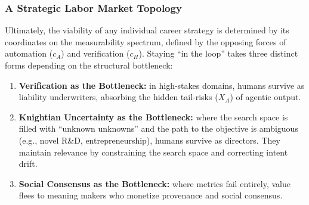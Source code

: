 \documentclass[12pt, letter]{article}
\begin{document}
\subsubsection{A Strategic Labor Market Topology}

Ultimately, the viability of any individual career strategy is determined by its coordinates on the measurability spectrum, defined by the opposing forces of automation ($c_A$) and verification ($c_H$). Staying ``in the loop'' takes three distinct forms depending on the structural bottleneck:

\begin{enumerate}

\item \textbf{Verification as the Bottleneck:} in high-stakes domains, humans survive as liability underwriters, absorbing the hidden tail-risks ($X_A$) of agentic output.

\item \textbf{Knightian Uncertainty as the Bottleneck:} where the search space is filled with ``unknown unknowns'' and the path to the objective is ambiguous (e.g., novel R\&D, entrepreneurship), humans survive as directors. They maintain relevance by constraining the search space and correcting intent drift.

\item \textbf{Social Consensus as the Bottleneck:} where metrics fail entirely, value flees to meaning makers who monetize provenance and social consensus.

\end{enumerate}
\end{document}
